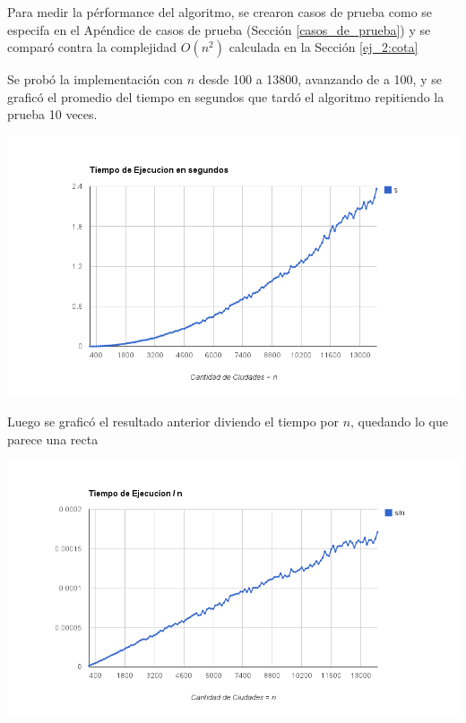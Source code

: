 Para medir la p\'erformance del algoritmo, se crearon casos de prueba como se especifa en el Ap\'endice de casos de prueba (Secci\'on \ref{casos_de_prueba}) y se compar\'o contra la complejidad $O(n^2)$ calculada en la Secci\'on \ref{ej_2:cota}

Se prob\'o la implementaci\'on con $n$ desde 100 a 13800, avanzando de a 100, y se grafic\'o el promedio del tiempo en segundos que tard\'o el algoritmo repitiendo la prueba 10 veces.

\begin{center}
	\includegraphics[scale=0.6]{images/ej2_n.png}
\end{center}

Luego se grafic\'o el resultado anterior diviendo el tiempo por $n$, quedando lo que parece una recta
\begin{center}
	\includegraphics[scale=0.6]{images/ej2_d_n.png}
\end{center}

